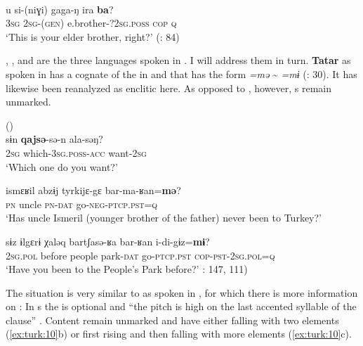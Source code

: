 \ea%
    \label{ex:turk:8}
    \\
    \gll u  si-(niɣi)  gaga-ŋ      ira \textbf{{ba}}?\\
    3\textsc{sg}  2\textsc{sg}-(\textsc{gen})  e.brother-?2\textsc{sg.poss}  \textsc{cop}  \textsc{q}\\
    \glt ‘This is your elder brother, right?’ (\citealt{LinLianyun1985}: 84)
    \z

, , and  are the three \textbf{} languages spoken in . I will address them in turn. \textbf{Tatar} as spoken in  has a cognate of the  in  and  that has the form \textit{=mə} {\textasciitilde} \textit{=mɨ} (\citealt{ChenZongzhenYiLiqian1986}: 30). It has likewise been reanalyzed as enclitic here. As opposed to , however, s remain unmarked.

\ea%
    \label{ex:turk:9}
     ()\\
    \ea
    \gll sɨn \textbf{{qajsə}}{-sə-n    ala-səŋ?}\\
    2\textsc{sg}  which-3\textsc{sg.poss}-\textsc{acc}  want-2\textsc{sg}\\
    \glt ‘Which one do you want?’
    
    \ex
    \gll ismɛʁil    abzɨj  tyrkijɛ-gɛ  bar-ma-ʁan=\textbf{{mə}}?\\
    \textsc{pn}    uncle  \textsc{pn}-\textsc{dat}    go-\textsc{neg}-\textsc{ptcp.pst=q}\\
    \glt ‘Has uncle Ismeril (younger brother of the father) never been to Turkey?’
    
    \ex
    \gll sɨz    ɨlgɛrɨ  χaləq  bartʃasə-ʁa  bar-ʁan i-di-gɨz=\textbf{{mɨ}}?\\
    2\textsc{sg.pol}  before  people  park-\textsc{dat}  go-\textsc{ptcp.pst} \textsc{cop}-\textsc{pst}-2\textsc{sg.pol=q}\\
    \glt ‘Have you been to the People’s Park before?’ \citealt{ChenZongzhenYiLiqian1986}: 147, 111)\z\z

The situation is very similar to  as spoken in , for which there is more information on : In s the  is optional and “the pitch is high on the last accented syllable of the clause” \citep[126]{Poppe1963}. Content  remain unmarked and have either falling  with two elements (\ref{ex:turk:10}b) or first rising and then falling  with more elements (\ref{ex:turk:10}c).

